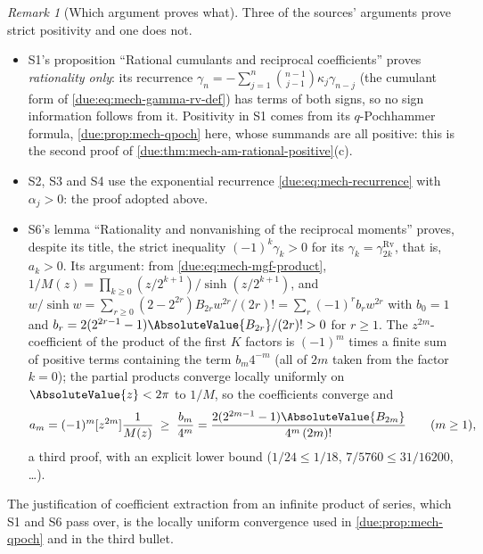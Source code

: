 \documentclass[11pt,oneside]{article}
\theoremstyle{plain}
\theoremstyle{definition}
\theoremstyle{remark}
\newtheorem{remark}[theorem]{Remark}
\newcommand{\am}[1]{a_{#1}}                                 %
\begin{document}
\begin{remark}[Which argument proves what]
\label{due:rmk:mech-positivity-routes}
Three of the sources' arguments prove strict positivity and one does not.
\begin{itemize}
\item S1's proposition ``Rational cumulants and reciprocal coefficients''
proves \emph{rationality only}: its recurrence
\(\gamma_n=-\sum_{j=1}^{n}\binom{n-1}{j-1}\kappa_j\gamma_{n-j}\) (the
cumulant form of \cref{due:eq:mech-gamma-rv-def}) has terms of both signs,
so no sign information follows from it.  Positivity in S1 comes from its
\(q\)-Pochhammer formula, \cref{due:prop:mech-qpoch} here, whose summands are
all positive: this is the second proof of
\cref{due:thm:mech-am-rational-positive}(c).
\item S2, S3 and S4 use the exponential recurrence
\cref{due:eq:mech-recurrence} with \(\alpha_j>0\): the proof adopted above.
\item S6's lemma ``Rationality and nonvanishing of the reciprocal moments''
proves, despite its title, the strict inequality \((-1)^{k}\gamma_{k}>0\) for
its \(\gamma_k=\gamma^{\mathrm{Rv}}_{2k}\), that is, \(\am{k}>0\).  Its
argument: from
\cref{due:eq:mech-mgf-product}, \(1/M(z)=\prod_{k\ge0}(z/2^{k+1})/\sinh(z/2^{k+1})\),
and \(w/\sinh w=\sum_{r\ge0}(2-2^{2r})B_{2r}w^{2r}/(2r)!=\sum_r(-1)^{r}b_rw^{2r}\)
with \(b_0=1\) and \(b_r=2(2^{2r-1}-1)\AbsoluteValue{B_{2r}}/(2r)!>0\) for
\(r\ge1\).  The \(z^{2m}\)-coefficient of the product of the first \(K\)
factors is \((-1)^{m}\) times a finite sum of positive terms containing the
term \(b_m4^{-m}\) (all of \(2m\) taken from the factor \(k=0\)); the partial
products converge locally uniformly on \(\AbsoluteValue{z}<2\pi\) to
\(1/M\), so the coefficients converge and
\begin{equation}
 \am{m}=(-1)^{m}[z^{2m}]\frac1{M(z)}\;\ge\;\frac{b_m}{4^{m}}
 =\frac{2(2^{2m-1}-1)\AbsoluteValue{B_{2m}}}{4^{m}\,(2m)!}\qquad(m\ge1),
 \label{due:eq:mech-lower-bound}
\end{equation}
a third proof, with an explicit lower bound (\(1/24\le1/18\),
\(7/5760\le31/16200\), \ldots).
\end{itemize}
The justification of coefficient extraction from an infinite product of
series, which S1 and S6 pass over, is the locally uniform convergence used
in \cref{due:prop:mech-qpoch} and in the third bullet.
\end{remark}
\end{document}
